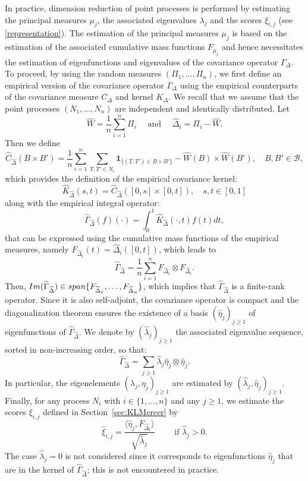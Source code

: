 \documentclass[aos]{imsart}
\theoremstyle{plain}
\theoremstyle{remark}
\newcommand{\1}{1}
\begin{document}
In practice, dimension reduction of point processes is performed by estimating the principal measures $\mu_j$, the associated eigenvalues $\lambda_j$ and the scores   $\xi_{i,j}$ (see \eqref{representation}). The estimation of the principal measures $\mu_j$ is based on the estimation of the associated cumulative mass functions $F_{\mu_j}$ and hence necessitates the estimation of eigenfunctions and eigenvalues of the covariance operator $\Gamma_{\Delta}$. To proceed, by using the random measures $(\Pi_1,\ldots,\Pi_n)$, we first define an empirical version of the covariance operator $\Gamma_\Delta$ using the empirical counterparts of the covariance measure $C_\Delta$ and kernel $K_\Delta$. We recall that we assume that the point processes $(N_1, \ldots, N_n)$ are independent and identically distributed.
Let  
$$
\widehat{W} = \frac{1}{n} \sum_{i=1}^n \Pi_i \quad\text{ and }\quad\widehat{\Delta}_i = \Pi_i-\widehat{W}.
$$
Then we define 
\[
\widehat C_{\widehat\Delta}(B \times B')=\frac1n\sum_{i=1}^n\sum_{T, T'\in N_i}\mathbf 1_{\{(T,T')\in B \times B'\}}-\widehat W (B) \times\widehat W(B'), \quad B, B' \in\mathcal B,
\]
which provides the definition of the empirical covariance kernel:
\[
\widehat K_{\widehat\Delta}(s,t)=\widehat C_{\widehat\Delta}([0,s]\times[0,t]),\quad s,t\in[0,1]
\]  
along with the empirical integral operator:
\[
\widehat\Gamma_{\widehat\Delta}(f)(\cdot) = \int_0^1\widehat K_{\widehat\Delta}(\cdot,t)f(t)dt,
\]
that can be expressed using the cumulative mass functions of the empirical measures, namely $F_{\widehat\Delta_i}(t)=\widehat\Delta_i([0,t])$, which leads to 
\begin{equation*}\label{dec-hatGamma}
\widehat\Gamma_{\widehat\Delta}=\frac1n\sum_{i=1}^nF_{\widehat\Delta_i}\otimes F_{\widehat\Delta_i}.
\end{equation*}
 Then, ${\rm Im}(\widehat\Gamma_{\widehat\Delta})\in{\rm span}\{F_{\widehat\Delta_1},\hdots,F_{\widehat\Delta_n}\}$, which implies that $\widehat\Gamma_{\widehat\Delta}$ is a finite-rank operator. Since it is also self-adjoint, the covariance operator is compact and the diagonalization theorem ensures the existence of a basis $(\widehat\eta_j)_{j\geq 1}$ of eigenfunctions of $\widehat\Gamma_{\widehat\Delta}$. We denote by $(\widehat\lambda_j)_{j\geq 1}$ the associated eigenvalue sequence, sorted in non-increasing order, so that:
 $$
 \widehat\Gamma_{\widehat\Delta}= \sum_{j \geq 1} \widehat{\lambda}_j \widehat{\eta}_j \otimes \widehat{\eta}_j.
 $$
 In particular, the eigenelements $(\lambda_j,\eta_j)_{j\geq 1}$ are estimated by $(\widehat{\lambda}_j, \widehat{\eta}_j)_{j\geq 1}$.  Finally, for any process $N_i$ with $i\in\{1,\ldots,n\}$ and any $j\geq 1$, we estimate the scores  $\xi_{i,j}$ defined in Section~\ref{sec:KLMercer} by
\[
\widehat\xi_{i,j} = \frac{\langle \widehat \eta_j,F_{\widehat\Delta_i}\rangle}{\sqrt{\widehat\lambda_j}} \qquad\text{ if }\widehat\lambda_j>0. 
 \]
The case $\widehat\lambda_j=0$ is not considered since it corresponds to eigenfunctions $\widehat\eta_j$ that are in the kernel of $\widehat\Gamma_{\widehat\Delta}$; this is not encountered in practice. 
 
\end{document}
